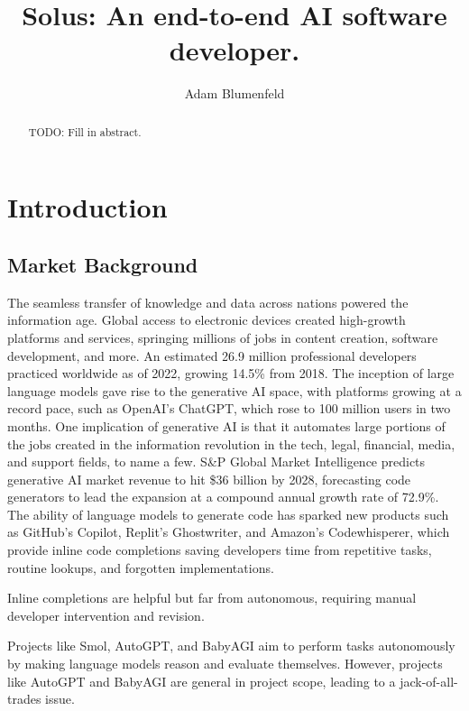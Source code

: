 \documentclass[a4paper,twocolumn,11pt]{quantumarticle}
\begin{document}
\title{Solus: An end-to-end AI software developer.}

\author{Adam Blumenfeld}
\maketitle

\begin{abstract}
  TODO: Fill in abstract.
\end{abstract}
\section{Introduction}
\subsection{Market Background}
The seamless transfer of knowledge and data across nations powered the information age. Global access to electronic devices created high-growth platforms and services, springing millions of jobs in content creation, software development, and more. An estimated 26.9 million professional developers practiced worldwide as of 2022, growing 14.5\% from 2018\cite{Qubit2022How}. The inception of large language models gave rise to the generative AI space, with platforms growing at a record pace, such as OpenAI's ChatGPT, which rose to 100 million users in two months\cite{Carr2023ChatGPT}. One implication of generative AI is that it automates large portions of the jobs created in the information revolution in the tech, legal, financial, media, and support fields, to name a few\cite{Mok2023ChatGPT}. S\&P Global Market Intelligence predicts generative AI market revenue to hit \$36 billion by 2028, forecasting code generators to lead the expansion at a compound annual growth rate of 72.9\%\cite{Park2023Generative}. The ability of language models to generate code has sparked new products such as GitHub's Copilot\cite{Dohmke2022GitHub}, Replit's Ghostwriter\cite{Masad2022Ghostwriter}, and Amazon's Codewhisperer\cite{Engdahl2023Amazon}, which provide inline code completions saving developers time from repetitive tasks, routine lookups, and forgotten implementations.

Inline completions are helpful but far from autonomous, requiring manual developer intervention and revision.

Projects like Smol\cite{Osika2023Current}, AutoGPT\cite{Ortiz2023What}, and BabyAGI\cite{Parthasarathy2023Meet} aim to perform tasks autonomously by making language models reason and evaluate themselves. However, projects like AutoGPT and BabyAGI are general in project scope, leading to a jack-of-all-trades issue.
\end{document}
